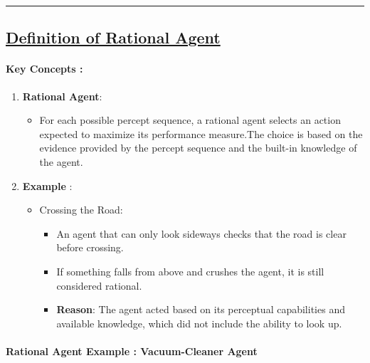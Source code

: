 \documentclass[
]{article}
\begin{document}
\begin{center}\rule{0.5\linewidth}{0.5pt}\end{center}

\subsection{\texorpdfstring{\ul{Definition of Rational
Agent}}{Definition of Rational Agent}}\label{definition-of-rational-agent}

\paragraph{Key Concepts :}\label{key-concepts-}

\begin{enumerate}
\def\labelenumi{\arabic{enumi}.}
\item
  \textbf{Rational Agent}:

  \begin{itemize}
  \item
    For each possible percept sequence, a rational agent selects an
    action expected to maximize its performance measure.The choice is
    based on the evidence provided by the percept sequence and the
    built-in knowledge of the agent.
  \end{itemize}
\item
  \textbf{Example }:

  \begin{itemize}
  \item
    Crossing the Road:

    \begin{itemize}
    \item
      An agent that can only look sideways checks that the road is clear
      before crossing.
    \item
      If something falls from above and crushes the agent, it is still
      considered rational.
    \item
      \textbf{Reason}: The agent acted based on its perceptual
      capabilities and available knowledge, which did not include the
      ability to look up.
    \end{itemize}
  \end{itemize}
\end{enumerate}

\paragraph{Rational Agent Example : Vacuum-Cleaner
Agent}\label{rational-agent-example--vacuum-cleaner-agent}
\end{document}
